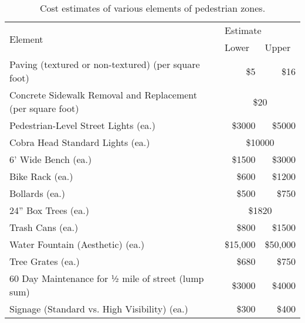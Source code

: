 \begin{table}[!htbp]
\centering
\begin{tabular}{@{}lrr@{}}
\toprule
\multirow{2}{*}{Element}                  & \multicolumn{2}{l}{Estimate}                          \\ \cmidrule(l){2-3} 
                                          & \multicolumn{1}{l}{Lower} & \multicolumn{1}{l}{Upper} \\
\midrule

Paving (textured or non-textured) (per square foot)         & \$5                   & \$16                  \\

Concrete Sidewalk Removal and Replacement (per square foot) & \multicolumn{2}{c}{\$20}                          \\


Pedestrian-Level Street Lights (ea.)            & \$3000                & \$5000                 \\
Cobra Head Standard Lights (ea.)               & \multicolumn{2}{c}{\$10000}                       \\
6’ Wide Bench (ea.)                           & \$1500                & \$3000                \\
Bike Rack (ea.)                                 & \$600                 & \$1200                 \\
Bollards (ea.)                                  & \$500                  & \$750                 \\
24” Box Trees (ea.)                             & \multicolumn{2}{c}{\$1820 }                        \\
Trash Cans (ea.)                                & \$800                 & \$1500                 \\
Water Fountain (Aesthetic) (ea.)                & \$15,000               & \$50,000               \\
Tree Grates (ea.)                               & \$680                  & \$750                  \\
60 Day Maintenance for ½ mile of street (lump sum)   & \$3000           & \$4000       \\
Signage (Standard vs. High Visibility) (ea.)    & \$300                & \$400               \\
\bottomrule
\end{tabular}
\caption[Cost estimates of various elements of pedestrian zones]{Cost estimates of various elements of pedestrian zones.}\label{table:pedestrian-zone-costs}
\end{table}